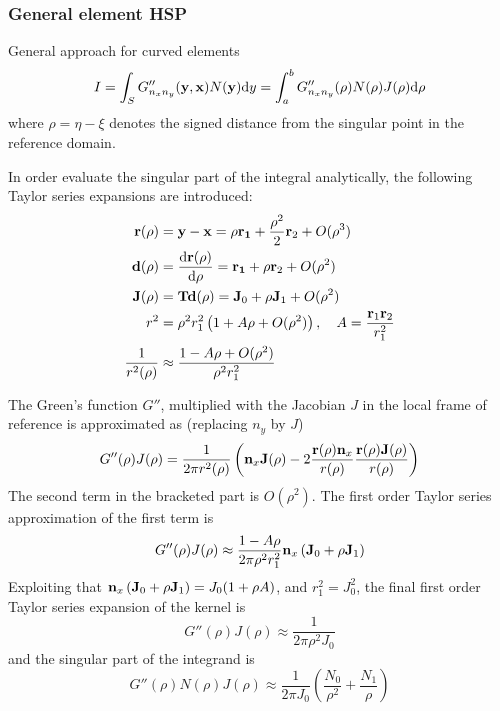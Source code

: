 \documentclass[a4paper,11pt]{article}
\newcommand{\td}{\mathrm{d}}
\begin{document}
\subsubsection{General element HSP}

General approach for curved elements
%
\begin{align}
	I = \int_S G''_{n_x n_y}({\bf y}, {\bf x}) N({\bf y}) \td y
	= \int_a^b G''_{n_x n_y}(\rho) N(\rho) J(\rho) \td \rho
\end{align}
%
where $\rho = \eta - \xi$ denotes the signed distance from the singular point in the reference domain.

In order evaluate the singular part of the integral analytically, the following Taylor series expansions are introduced:
\begin{align}
	{\bf r}(\rho) &= {\bf y} - {\bf x} = \rho {\bf r_1} + \frac{\rho^2}{2} {\bf r}_2 + O(\rho^3) \\
	{\bf d}(\rho) &= \frac{\td {\bf r}(\rho)}{\td \rho} = {\bf r_1} + \rho {\bf r}_2 + O(\rho^2)\\
	{\bf J}(\rho) &= {\bf T} {\bf d}(\rho) = {\bf J}_0 + \rho {\bf J}_1 + O(\rho^2) \\
	r^2 &= \rho^2 r_1^2 \left( 1 + A \rho + O(\rho^2) \right)
	,\quad A = \frac{{\bf r}_1 {\bf r}_2}{r_1^2} \\
	\frac{1}{r^2(\rho)} &\approx \frac{1 - A \rho + O(\rho^2)}{\rho^2 r_1^2}
\end{align}

The Green's function $G''$, multiplied with the Jacobian $J$ in the local frame of reference is approximated as (replacing $n_y$ by $J$)
%
\begin{equation}
	G''(\rho) J(\rho)
	= \frac{1}{2\pi r^2(\rho)} \left( {\bf n}_x {\bf J}(\rho) - 2 \frac{{\bf r}(\rho) {\bf n}_x}{r(\rho)} \frac{{\bf r}(\rho) {\bf J}(\rho)}{r(\rho)}\right)
\end{equation}
%
The second term in the bracketed part is $O(\rho^2)$.
The first order Taylor series approximation of the first term is
%
\begin{equation}
	G''(\rho) J(\rho) \approx \frac{1 - A \rho}{2\pi \rho^2 r_1^2} {\bf n}_x \left({\bf J}_0 + \rho {\bf J}_1\right) 
\end{equation}
%
Exploiting that ${\bf n}_x \left({\bf J}_0 + \rho {\bf J}_1\right) = J_0 (1 + \rho A)$, and $r_1^2 = J_0^2$, the final first order Taylor series expansion of the kernel is
%
\begin{equation}
	G''(\rho) J(\rho) \approx \frac{1}{2\pi \rho^2 J_0}
\end{equation}
%
and the singular part of the integrand is
%
\begin{equation}
	G''(\rho) N(\rho) J(\rho) \approx \frac{1}{2\pi J_0} \left( \frac{N_0}{\rho^2} +  \frac{N_1}{\rho} \right)
\end{equation}
\end{document}
